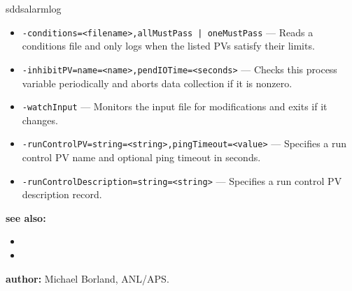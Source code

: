 \begin{sddsprog}{sddsalarmlog}
\begin{itemize}
  \item {\tt -conditions=<filename>,{allMustPass | oneMustPass}} --- Reads a conditions file and only logs when the listed PVs satisfy their limits.
  \item {\tt -inhibitPV=name=<name>,pendIOTime=<seconds>} --- Checks this process variable periodically and aborts data collection if it is nonzero.
  \item {\tt -watchInput} --- Monitors the input file for modifications and exits if it changes.
  \item {\tt -runControlPV=string=<string>,pingTimeout=<value>} --- Specifies a run control PV name and optional ping timeout in seconds.
  \item {\tt -runControlDescription=string=<string>} --- Specifies a run control PV description record.
\end{itemize}

\item \textbf{see also:}
\begin{itemize}
  \item {}
  \item {}
\end{itemize}


\item \textbf{author:} Michael Borland, ANL/APS.
\end{sddsprog}
